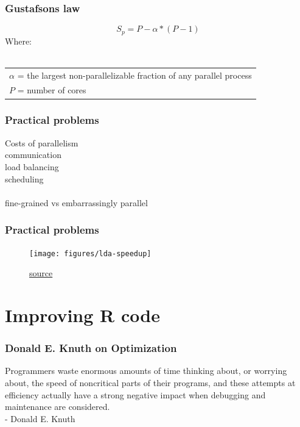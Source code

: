 \documentclass{beamer}
\begin{document}
\begin{frame}
	\frametitle{Gustafsons law}
	\begin{center}
		\begin{equation*}
		S_p = P - \alpha * (P- 1)
		\end{equation*}
		Where: \\~\\
		\begin{tabular}{ l }
			$\alpha$ = the largest non-parallelizable fraction of any parallel 
			process \\
			$P$ = number of cores \\
		\end{tabular}
	\end{center}
\end{frame}

\begin{frame}
	\frametitle{Practical problems}
	\begin{center}
		Costs of parallelism \\
		communication \\
		load balancing \\
		scheduling \\~\\
		fine-grained vs embarrassingly parallel
	\end{center}
\end{frame}

\begin{frame}
	\frametitle{Practical problems}
	\begin{figure}[t]
		\begin{center}
			\texttt{[image: figures/lda-speedup]}	\\
		\end{center}
		\caption{\href{http://arxiv.org/abs/1506.03784}{source}}
	\end{figure}
\end{frame}

\section{Improving R code}

\begin{frame}
	\frametitle{Donald E. Knuth on Optimization}
	Programmers waste enormous amounts of time thinking about, or worrying 
	about, the speed of noncritical parts of their programs, and these attempts 
	at efficiency actually have a strong negative impact when debugging and 
	maintenance are considered.\\
	- Donald E. Knuth
\end{frame}
\end{document}
